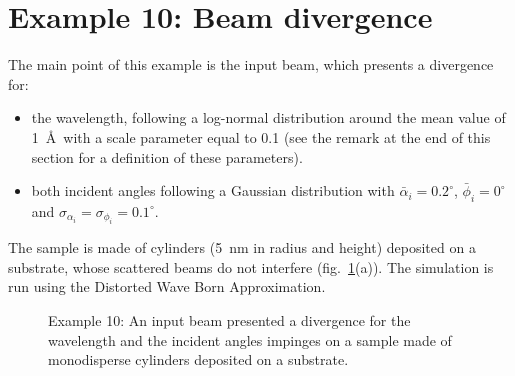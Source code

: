 \newpage
\section{Example 10: Beam divergence}
The main point of this example is the input beam, which presents a divergence for:
\begin{itemize}
\item the wavelength, following a log-normal distribution around the mean value of 1~\AA\ with a scale parameter equal to 0.1 (see the remark at the end of this section for a definition of these parameters).
\item  both incident angles following a Gaussian distribution with 
$\bar \alpha_i=0.2^{\circ}$, $\bar\phi_i=0^{\circ}$ and $\sigma_{\alpha_i}=\sigma_{\phi_i}=0.1^{\circ}$.
\end{itemize}
The sample is made of cylinders (5~nm in radius and height) deposited on a substrate, whose scattered beams do not interfere (fig.~\ref{fig:PythonEx10BeamDiv}(a)). The simulation is run using the Distorted Wave Born Approximation.

\begin{figure}[H]
\hfill
{}
\hfill
{}
\hfill
\caption{Example 10: An input beam presented a divergence for the wavelength and the incident angles impinges on a sample made of monodisperse cylinders deposited on a substrate.}
\label{fig:PythonEx10BeamDiv}
\end{figure}

